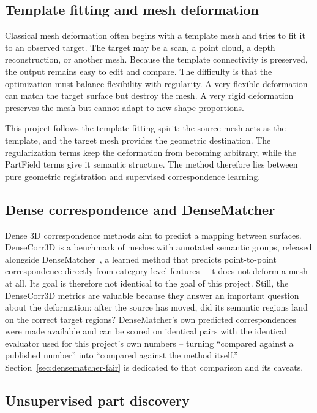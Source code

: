\documentclass{article}
\begin{document}
\subsection{Template fitting and mesh deformation}

Classical mesh deformation often begins with a template mesh and tries to fit it to an observed
target. The target may be a scan, a point cloud, a depth reconstruction, or another mesh. Because
the template connectivity is preserved, the output remains easy to edit and compare. The difficulty
is that the optimization must balance flexibility with regularity. A very flexible deformation can
match the target surface but destroy the mesh. A very rigid deformation preserves the mesh but
cannot adapt to new shape proportions.

This project follows the template-fitting spirit: the source mesh acts as the template, and the
target mesh provides the geometric destination. The regularization terms keep the deformation from
becoming arbitrary, while the PartField terms give it semantic structure. The method therefore
lies between pure geometric registration and supervised correspondence learning.

\subsection{Dense correspondence and DenseMatcher}

Dense 3D correspondence methods aim to predict a mapping between surfaces. DenseCorr3D is a
benchmark of meshes with annotated semantic groups, released alongside
DenseMatcher~\cite{densematcher}, a learned method that predicts point-to-point correspondence
directly from category-level features -- it does not deform a mesh at all. Its goal is therefore
not identical to the goal of this project. Still, the DenseCorr3D metrics are valuable because they
answer an important question about the deformation: after the source has moved, did its semantic
regions land on the correct target regions? DenseMatcher's own predicted
correspondences were made available and can be scored on identical pairs with the identical
evaluator used for this project's own numbers -- turning ``compared against a published number''
into ``compared against the method itself.'' Section~\ref{sec:densematcher-fair} is dedicated to
that comparison and its caveats.

\subsection{Unsupervised part discovery}
\end{document}
